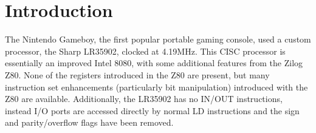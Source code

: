 \section{Introduction}

The Nintendo Gameboy, the first popular portable gaming console, used a custom processor, the Sharp LR35902, clocked at 4.19MHz.  This CISC processor is essentially an improved Intel 8080, with some additional features from the Zilog Z80.  None of the registers introduced in the Z80 are present, but many instruction set enhancements (particularly bit manipulation) introduced with the Z80 are available.  Additionally, the LR35902 has no IN/OUT instructions, instead I/O ports are accessed directly by normal LD instructions and the sign and parity/overflow flags have been removed.